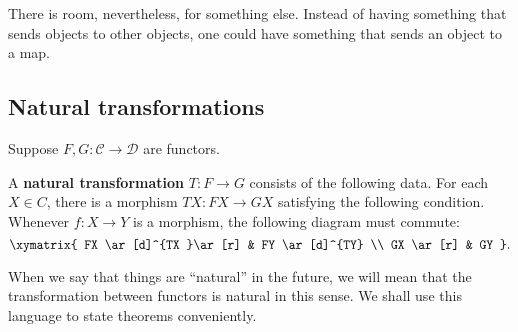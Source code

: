 There is room, nevertheless, for something else. Instead of having
something that sends objects to other objects, one could have something that
sends an object to a map.



\subsection{Natural transformations}



Suppose $F, G: \mathcal{C} \to \mathcal{D}$ are functors.

\begin{definition}
A \textbf{natural transformation} $T: F \to G$ consists of the following data.
For each $X \in C$, there is a morphism $TX: FX \to GX$ satisfying the
following
condition. Whenever $f: X \to Y$ is a morphism, the following diagram must
commute:
\[ \xymatrix{
FX \ar[d]^{TX }\ar[r] &  FY \ar[d]^{TY}  \\
GX \ar[r] &  GY
}.\]
\end{definition}

When we say that things are ``natural'' in the future, we will mean that the
transformation between functors is natural in this sense.
We shall use this language to state theorems conveniently.

